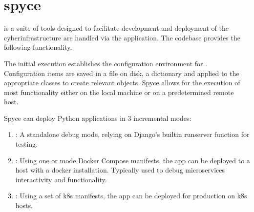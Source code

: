 \documentclass[letterpaper,12pt,english,openany,oneside]{sphinxmanual}
\begin{document}
\sphinxstepscope


\section{spyce}
\label{\detokenize{euidev/development/_autosummary/spyce:module-spyce}}\label{\detokenize{euidev/development/_autosummary/spyce:spyce}}\label{\detokenize{euidev/development/_autosummary/spyce::doc}}
\sphinxAtStartPar
{} is a suite of tools designed to facilitate development and deployment of the  cyberinfrastructure are handled via the   application. The   codebase provides the following functionality.

\sphinxAtStartPar
The initial execution establishes the configuration environment for . Configuration items are saved in a  file on disk, a  dictionary and applied to the appropriate classes to create relevant objects. Spyce allows for the execution of most functionality either on the local machine or on a pre\sphinxhyphen{}determined remote host.

\sphinxAtStartPar
Spyce can deploy Python applications in 3 incremental modes:
\begin{enumerate}
%
\item {} 
\sphinxAtStartPar
{}: A stand\sphinxhyphen{}alone debug mode, relying on Django’s built\sphinxhyphen{}in runserver function for testing.

\item {} 
\sphinxAtStartPar
{}: Using one or mode Docker Compose manifests, the app can be deployed to a host with a docker installation. Typically used to debug microservices interactivity and functionality.

\item {} 
\sphinxAtStartPar
{}: Using a set of k8s manifests, the app can be deployed for production on k8s hosts.

\end{enumerate}
\end{document}
